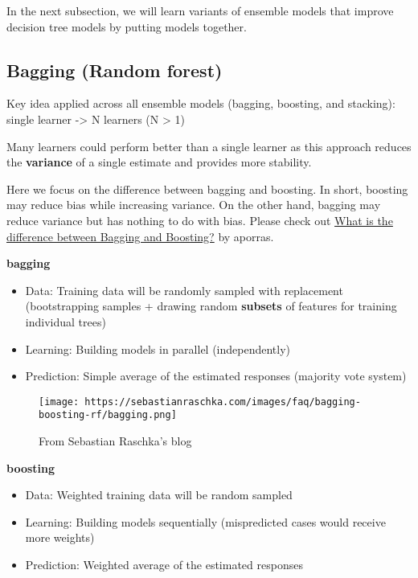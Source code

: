 \documentclass[
]{book}
\begin{document}
In the next subsection, we will learn variants of ensemble models that improve decision tree models by putting models together.

\hypertarget{bagging-random-forest}{%
\subsection{Bagging (Random forest)}\label{bagging-random-forest}}

Key idea applied across all ensemble models (bagging, boosting, and stacking):
single learner -\textgreater{} N learners (N \textgreater{} 1)

Many learners could perform better than a single learner as this approach reduces the \textbf{variance} of a single estimate and provides more stability.

Here we focus on the difference between bagging and boosting. In short, boosting may reduce bias while increasing variance. On the other hand, bagging may reduce variance but has nothing to do with bias. Please check out \href{https://quantdare.com/what-is-the-difference-between-bagging-and-boosting/}{What is the difference between Bagging and Boosting?} by aporras.

\textbf{bagging}

\begin{itemize}
\item
  Data: Training data will be randomly sampled with replacement (bootstrapping samples + drawing random \textbf{subsets} of features for training individual trees)
\item
  Learning: Building models in parallel (independently)
\item
  Prediction: Simple average of the estimated responses (majority vote system)
\end{itemize}

\begin{figure}
\centering
\texttt{[image: https://sebastianraschka.com/images/faq/bagging-boosting-rf/bagging.png]}
\caption{From Sebastian Raschka's blog}
\end{figure}

\textbf{boosting}

\begin{itemize}
\item
  Data: Weighted training data will be random sampled
\item
  Learning: Building models sequentially (mispredicted cases would receive more weights)
\item
  Prediction: Weighted average of the estimated responses
\end{itemize}
\end{document}
